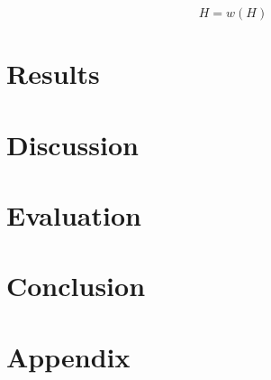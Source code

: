 \documentclass{AISB2008}
\begin{document}
\begin{equation}
H = w(H)
\end{equation}

\section{Results}




\section{Discussion}



\section{Evaluation}



\section{Conclusion}



\section{Appendix}
\end{document}
